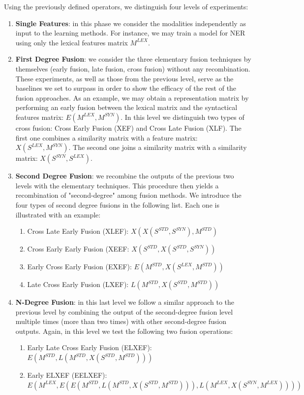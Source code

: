 \documentclass{llncs}
\newcommand\mlex{M^{\scriptscriptstyle LEX}}
\newcommand\msyn{M^{\scriptscriptstyle SYN}}
\newcommand\mstd{M^{\scriptscriptstyle STD}}
\newcommand\slex{S^{\scriptscriptstyle LEX}}
\newcommand\ssyn{S^{\scriptscriptstyle SYN}}
\newcommand\sstd{S^{\scriptscriptstyle STD}}
\begin{document}
Using the previously defined operators, we distinguish four levels of experiments: 
\begin{enumerate}
\item \textbf{Single Features}: in this phase we consider the modalities independently as input to the learning methods. For instance, we may train a model for NER using only the lexical features matrix $M^{LEX}$.
\item \textbf{First Degree Fusion}: we  consider the  three elementary fusion techniques by themselves (early fusion, late fusion, cross fusion) without any recombination.  These experiments, as well as those from the previous level, serve as the baselines we set to surpass in order to show the efficacy of the rest of the fusion approaches.
As an example, we may obtain a representation matrix by performing an early fusion between the lexical matrix and the syntactical features matrix: $E(M^{LEX}, M^{SYN})$. In this level we distinguish two types of cross fusion: Cross Early Fusion (XEF) and Cross Late Fusion (XLF). The first one combines a similarity matrix with a feature matrix: $X(\slex, \msyn)$. The second one joins a similarity matrix with a similarity matrix: $X(\ssyn, \slex)$.
\item \textbf{Second Degree Fusion}:  we recombine the outputs of the previous two levels with the elementary techniques. This procedure then yields a recombination of "second-degree" among fusion methods. We introduce the four types of second degree fusions in the following list. Each one is illustrated with an example:

\begin{enumerate}
\item Cross Late Early Fusion (XLEF): $X(X(\sstd, \ssyn), \mstd)$
\item Cross Early Early Fusion (XEEF: $X(\sstd, X(\sstd, \ssyn))$
\item Early Cross Early Fusion (EXEF): $E(\mstd,X(\slex, \mstd))$
\item Late Cross Early Fusion (LXEF): $L(\mstd, X(\sstd, \mstd))$
\end{enumerate}

\item \textbf{N-Degree Fusion}: in this last level we follow a similar approach to the previous level by combining the output of the second-degree fusion level multiple times (more than two times) with other second-degree fusion outputs. 
Again, in this level we test the following two fusion operations:
\begin{enumerate}
\item Early Late Cross Early Fusion (ELXEF): $E(\mstd, L(\mstd, X(\sstd, \mstd)))$
\item Early ELXEF (EELXEF): $E(\mlex, E(E(\mstd,  L(\mstd, X(\sstd, \mstd))),\allowbreak L(\mlex, X(\ssyn, \mlex))))$
\end{enumerate}


\end{enumerate}
\end{document}
